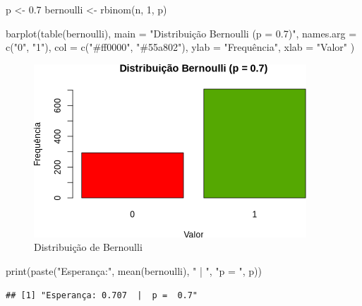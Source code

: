 \documentclass[
]{article}
\newenvironment{Shaded}{\begin{snugshade}}{\end{snugshade}}
\newcommand{\AttributeTok}[1]{\textcolor[rgb]{0.77,0.63,0.00}{#1}}
\newcommand{\DecValTok}[1]{\textcolor[rgb]{0.00,0.00,0.81}{#1}}
\newcommand{\FloatTok}[1]{\textcolor[rgb]{0.00,0.00,0.81}{#1}}
\newcommand{\FunctionTok}[1]{\textcolor[rgb]{0.00,0.00,0.00}{#1}}
\newcommand{\NormalTok}[1]{#1}
\newcommand{\OtherTok}[1]{\textcolor[rgb]{0.56,0.35,0.01}{#1}}
\newcommand{\StringTok}[1]{\textcolor[rgb]{0.31,0.60,0.02}{#1}}
\begin{document}
\begin{Shaded}
\begin{Highlighting}[]
\NormalTok{p }\OtherTok{\textless{}{-}} \FloatTok{0.7}
\NormalTok{bernoulli }\OtherTok{\textless{}{-}} \FunctionTok{rbinom}\NormalTok{(n, }\DecValTok{1}\NormalTok{, p)}

\FunctionTok{barplot}\NormalTok{(}\FunctionTok{table}\NormalTok{(bernoulli),}
  \AttributeTok{main =} \StringTok{"Distribuição Bernoulli (p = 0.7)"}\NormalTok{,}
  \AttributeTok{names.arg =} \FunctionTok{c}\NormalTok{(}\StringTok{"0"}\NormalTok{, }\StringTok{"1"}\NormalTok{),}
  \AttributeTok{col =} \FunctionTok{c}\NormalTok{(}\StringTok{"\#ff0000"}\NormalTok{, }\StringTok{"\#55a802"}\NormalTok{),}
  \AttributeTok{ylab =} \StringTok{"Frequência"}\NormalTok{,}
  \AttributeTok{xlab =} \StringTok{"Valor"}
\NormalTok{)}
\end{Highlighting}
\end{Shaded}

\begin{figure}

{\centering \includegraphics{7_activity_files/figure-latex/bernoulli-plot-1} 

}

\caption{Distribuição de Bernoulli}\label{fig:bernoulli-plot}
\end{figure}

\begin{Shaded}
\begin{Highlighting}[]
\FunctionTok{print}\NormalTok{(}\FunctionTok{paste}\NormalTok{(}\StringTok{"Esperança:"}\NormalTok{, }\FunctionTok{mean}\NormalTok{(bernoulli), }\StringTok{" | "}\NormalTok{, }\StringTok{"p = "}\NormalTok{, p))}
\end{Highlighting}
\end{Shaded}

\begin{verbatim}
## [1] "Esperança: 0.707  |  p =  0.7"
\end{verbatim}
\end{document}
